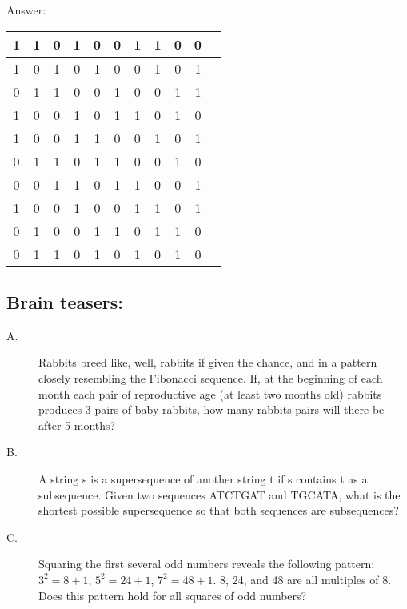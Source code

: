 \documentclass{article}
\begin{document}
Answer:
\begin{table}[ht]
\centering
\begin{tabular}{|c|c|c|c|c|c|c|c|c|c|c|}
\hline 1 & 1 & 0 & 1 & 0 & 0 & 1 & 1 & 0 & 0 \\ 
\hline 1 & 0 & 1 & 0 & 1 & 0 & 0 & 1 & 0 & 1 \\ 
\hline 0 & 1 & 1 & 0 & 0 & 1 & 0 & 0 & 1 & 1 \\ 
\hline 1 & 0 & 0 & 1 & 0 & 1 & 1 & 0 & 1 & 0 \\ 
\hline 1 & 0 & 0 & 1 & 1 & 0 & 0 & 1 & 0 & 1 \\ 
\hline 0 & 1 & 1 & 0 & 1 & 1 & 0 & 0 & 1 & 0 \\ 
\hline 0 & 0 & 1 & 1 & 0 & 1 & 1 & 0 & 0 & 1 \\ 
\hline 1 & 0 & 0 & 1 & 0 & 0 & 1 & 1 & 0 & 1 \\ 
\hline 0 & 1 & 0 & 0 & 1 & 1 & 0 & 1 & 1 & 0 \\ 
\hline 0 & 1 & 1 & 0 & 1 & 0 & 1 & 0 & 1 & 0 \\
\hline
\end{tabular}
\end{table} 


\subsection*{Brain teasers:}
\begin{description}
\item[A.] Rabbits breed like, well, rabbits if given the chance, and in a pattern closely resembling the Fibonacci sequence. If, at the beginning of each month each pair of reproductive age (at least two months old) rabbits produces 3 pairs of baby rabbits, how many rabbits pairs will there be after 5 months? 

\item[B.] A string s is a supersequence of another string t if s contains t as a subsequence. Given two sequences ATCTGAT and TGCATA, what is the shortest possible supersequence so that both sequences are subsequences? 

\item[C.] Squaring the first several odd numbers reveals the following pattern: $3^2 = 8 + 1$, $5^2 = 24 + 1$, $7^2 = 48 + 1$. 8, 24, and 48 are all multiples of 8. Does this pattern hold for all squares of odd numbers? 

\end{description}
\end{document}
